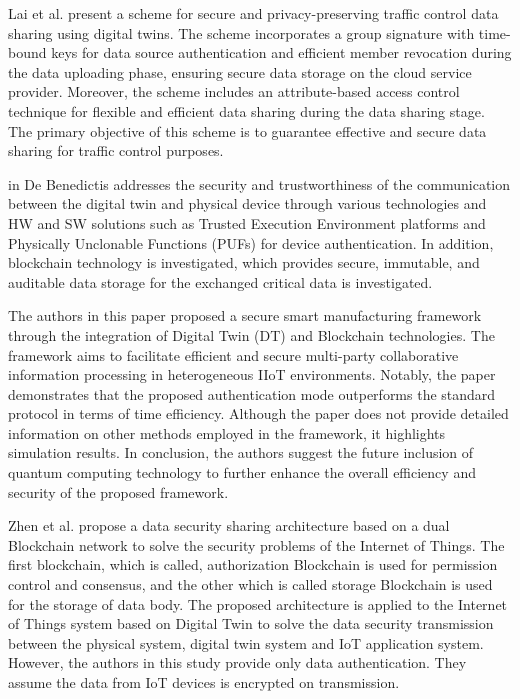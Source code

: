 Lai et al.\cite{chengzhelaiSPDTSecurePrivacyPreserving2022} present a scheme for secure and privacy-preserving traffic control data sharing using digital twins. The scheme incorporates a group signature with time-bound keys for data source authentication and efficient member revocation during the data uploading phase, ensuring secure data storage on the cloud service provider. Moreover, the scheme includes an attribute-based access control technique for flexible and efficient data sharing during the data sharing stage. The primary objective of this scheme is to guarantee effective and secure data sharing for traffic control purposes.

in\cite{debenedictisAdoptionSecureCyber2022} De Benedictis addresses the security and trustworthiness of the communication between the digital twin and physical device through various technologies and HW and SW solutions such as Trusted Execution Environment platforms and Physically Unclonable Functions (PUFs) for device authentication. In addition, blockchain technology is investigated, which provides secure, immutable, and auditable data storage for the exchanged critical data is investigated. 




The authors in this paper \cite{chenDigitalTwinBasedHeuristic2023a} proposed a secure smart manufacturing framework through the integration of Digital Twin (DT) and Blockchain technologies. The framework aims to facilitate efficient and secure multi-party collaborative information processing in heterogeneous IIoT environments. Notably, the paper demonstrates that the proposed authentication mode outperforms the standard protocol in terms of time efficiency. Although the paper does not provide detailed information on other methods employed in the framework, it highlights simulation results. In conclusion, the authors suggest the future inclusion of quantum computing technology to further enhance the overall efficiency and security of the proposed framework.


Zhen et al. \cite{zhengBlockchainBasedTrustworthy2022a} propose a data security sharing architecture based on a dual Blockchain network to solve the security problems of the Internet of Things. The first blockchain, which is called, authorization Blockchain is used for permission control and consensus, and the other which is called storage Blockchain is used for the storage of data body. The proposed architecture is applied to the Internet of Things system based on Digital Twin to solve the data security transmission between the physical system, digital twin system and IoT application system. However, the authors in this study provide only data authentication. They assume the data from IoT devices is encrypted on transmission.  


